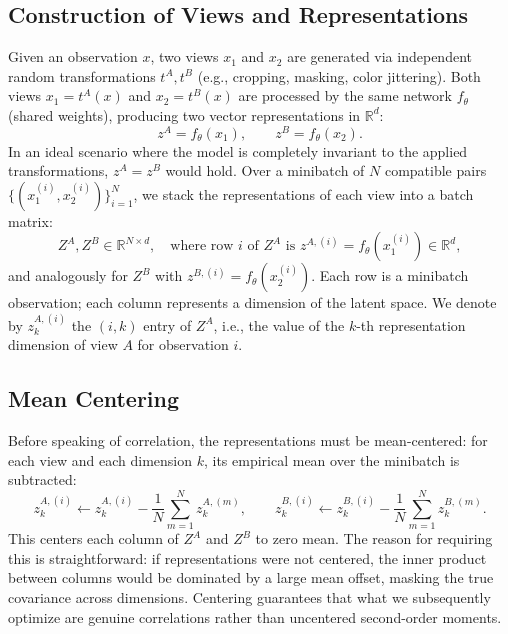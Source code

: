 \documentclass[11pt, oneside, openany]{book}
\begin{document}
\subsection{Construction of Views and Representations}
\label{sec:5.2.1}

Given an observation $x$, two views $x_{1}$ and $x_{2}$ are generated via independent random transformations $t^{A}, t^{B}$ (e.g., cropping, masking, color jittering). Both views $x_{1} = t^{A}(x)$ and $x_{2} = t^{B}(x)$ are processed by the same network $f_{\theta}$ (shared weights), producing two vector representations in $\mathbb{R}^{d}$:
\begin{equation}
\label{eq:5.16}
z^{A} = f_{\theta}(x_{1}), \qquad z^{B} = f_{\theta}(x_{2}).
\end{equation}
In an ideal scenario where the model is completely invariant to the applied transformations, $z^{A} = z^{B}$ would hold. Over a minibatch of $N$ compatible pairs $\{(x_{1}^{(i)}, x_{2}^{(i)})\}_{i=1}^{N}$, we stack the representations of each view into a batch matrix:
\begin{equation}
\label{eq:5.17}
Z^{A}, Z^{B} \in \mathbb{R}^{N \times d}, \quad \text{where row } i \text{ of } Z^{A} \text{ is } z^{A,(i)} = f_{\theta}(x_{1}^{(i)}) \in \mathbb{R}^{d},
\end{equation}
and analogously for $Z^{B}$ with $z^{B,(i)} = f_{\theta}(x_{2}^{(i)})$. Each row is a minibatch observation; each column represents a dimension of the latent space. We denote by $z_{k}^{A,(i)}$ the $(i,k)$ entry of $Z^{A}$, i.e., the value of the $k$-th representation dimension of view $A$ for observation $i$.

\subsection{Mean Centering}
\label{sec:5.2.2}

Before speaking of correlation, the representations must be mean-centered: for each view and each dimension $k$, its empirical mean over the minibatch is subtracted:
\begin{equation}
\label{eq:5.18}
z_{k}^{A,(i)} \leftarrow z_{k}^{A,(i)} - \frac{1}{N}\sum_{m=1}^{N} z_{k}^{A,(m)}, \qquad z_{k}^{B,(i)} \leftarrow z_{k}^{B,(i)} - \frac{1}{N}\sum_{m=1}^{N} z_{k}^{B,(m)}.
\end{equation}
This centers each column of $Z^{A}$ and $Z^{B}$ to zero mean. The reason for requiring this is straightforward: if representations were not centered, the inner product between columns would be dominated by a large mean offset, masking the true covariance across dimensions. Centering guarantees that what we subsequently optimize are genuine correlations rather than uncentered second-order moments.
\end{document}
